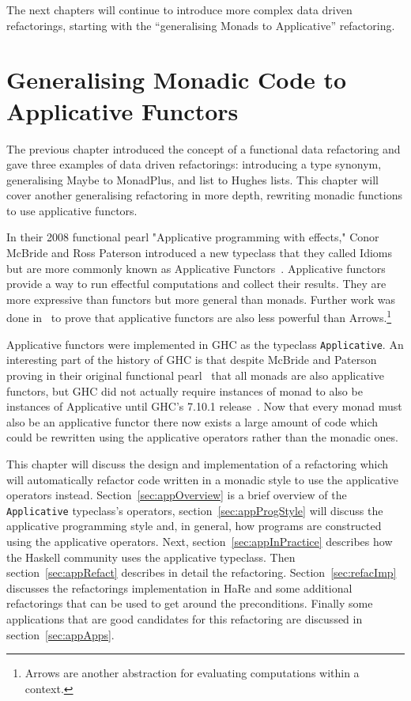 The next chapters will continue to introduce more complex data driven refactorings, starting with the ``generalising Monads to Applicative'' refactoring.



\chapter{Generalising Monadic Code to Applicative Functors}
\label{chp:applicative}

The previous chapter introduced the concept of a functional data refactoring and gave three examples of data driven refactorings: introducing a type synonym, generalising Maybe to MonadPlus, and list to Hughes lists. This chapter will cover another generalising refactoring in more depth, rewriting monadic functions to use applicative functors. 

In their 2008 functional pearl "Applicative programming with effects," Conor McBride and Ross Paterson introduced a new typeclass that they called Idioms but are more commonly known as Applicative Functors~\citep{mcbrideIdioms}. Applicative functors provide a way to run effectful computations and collect their results. They are more expressive than functors but more general than monads. Further work was done in~\citep{arrowsAndIdioms} to prove that applicative functors are also less powerful than Arrows.\footnote{Arrows are another abstraction for evaluating computations within a context.} 

Applicative functors were implemented in GHC as the typeclass \texttt{Applicative}. An interesting part of the history of GHC is that despite McBride and Paterson proving in their original functional pearl~\citep{mcbrideIdioms} that all monads are also applicative functors, but  GHC did not actually require instances of monad to also be instances of Applicative until GHC's 7.10.1 release~\citep{ghc7.10Release}. Now that every monad must also be an applicative functor there now exists a large amount of code which could be rewritten using the applicative operators rather than the monadic ones. 

This chapter will discuss the design and implementation of a refactoring which will automatically refactor code written in a monadic style to use the applicative operators instead. Section~\ref{sec:appOverview} is a brief overview of the \texttt{Applicative} typeclass's operators, section~\ref{sec:appProgStyle} will discuss the applicative programming style and, in general, how programs are constructed using the applicative operators. Next, section~\ref{sec:appInPractice} describes how the Haskell community uses the applicative typeclass. Then section~\ref{sec:appRefact} describes in detail the refactoring. Section~\ref{sec:refacImp} discusses the refactorings implementation in HaRe and some additional refactorings that can be used to get around the preconditions. Finally some applications that are good candidates for this refactoring are discussed in section~\ref{sec:appApps}.

